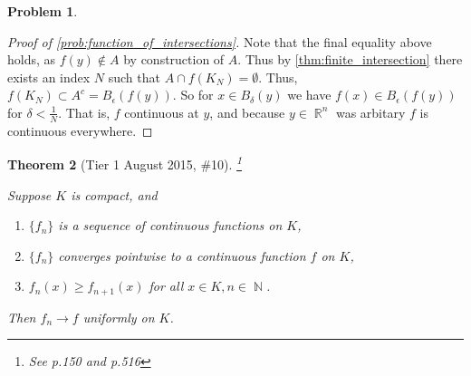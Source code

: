 \documentclass[english]{article}
\DeclareMathOperator{\R}{\mathbb{R}}
\DeclareMathOperator{\N}{\mathbb{N}}
\newtheorem{theorem}{Theorem} %
\theoremstyle{definition}
\newtheorem{problem}[theorem]{Problem}
\begin{document}
\begin{problem}
\begin{proof}[Proof of \cref{prob:function_of_intersections}]
        Note that the final equality above holds, as $f(y) \not \in A$ by construction of $A$. Thus by \cref{thm:finite_intersection} there exists an index $N$ such that $A \cap f(K_N) = \emptyset$. Thus, $f(K_N) \subset A^c = B_{\epsilon}(f(y))$. So for $x \in B_{\delta}(y)$ we have $f(x) \in B_{\epsilon}(f(y))$ for $\delta < \frac{1}{N}$. That is, $f$ continuous at $y$, and because $y \in \R^n$ was arbitary $f$ is continuous everywhere. 
    \end{proof}
\end{problem}

\begin{theorem}[Tier 1 August 2015, \#10] \footnote{See \cite{rudin} p.150 and p.516}
    \label{thm:unif_convergence}

    Suppose $K$ is compact, and 
    \begin{enumerate}
        \item \label{enum:thm:unif_convergence_1} $\{f_n\}$ is a sequence of continuous functions on $K$,
        \item \label{enum:thm:unif_convergence_2} $\{f_n\}$ converges pointwise to a continuous function $f$ on $K$,
        \item \label{enum:thm:unif_convergence_3} $f_n(x) \geq f_{n + 1}(x)$ for all $x \in K, n \in \N$.
    \end{enumerate}

    Then $f_n \to f$ uniformly on $K$.
\end{theorem}
\end{document}
